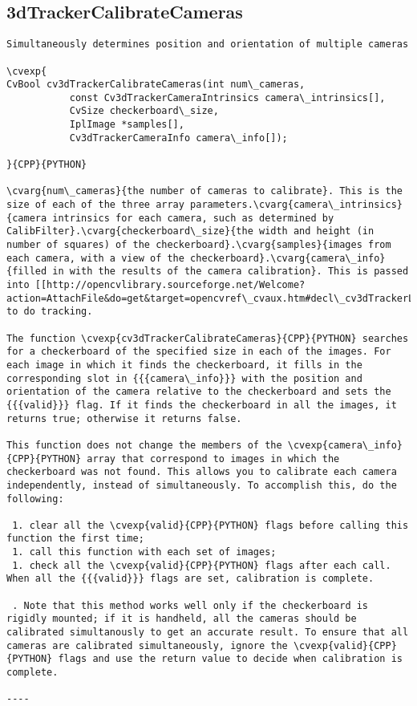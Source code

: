 \subsection{3dTrackerCalibrateCameras}
\begin{verbatim}
Simultaneously determines position and orientation of multiple cameras

\cvexp{
CvBool cv3dTrackerCalibrateCameras(int num\_cameras,
           const Cv3dTrackerCameraIntrinsics camera\_intrinsics[],
           CvSize checkerboard\_size,
           IplImage *samples[],
           Cv3dTrackerCameraInfo camera\_info[]);

}{CPP}{PYTHON}

\cvarg{num\_cameras}{the number of cameras to calibrate}. This is the size of each of the three array parameters.\cvarg{camera\_intrinsics}{camera intrinsics for each camera, such as determined by CalibFilter}.\cvarg{checkerboard\_size}{the width and height (in number of squares) of the checkerboard}.\cvarg{samples}{images from each camera, with a view of the checkerboard}.\cvarg{camera\_info}{filled in with the results of the camera calibration}. This is passed into [[http://opencvlibrary.sourceforge.net/Welcome?action=AttachFile&do=get&target=opencvref\_cvaux.htm#decl\_cv3dTrackerLocateObjects|3dTrackerLocateObjects]] to do tracking.

The function \cvexp{cv3dTrackerCalibrateCameras}{CPP}{PYTHON} searches for a checkerboard of the specified size in each of the images. For each image in which it finds the checkerboard, it fills in the corresponding slot in {{{camera\_info}}} with the position and orientation of the camera relative to the checkerboard and sets the {{{valid}}} flag. If it finds the checkerboard in all the images, it returns true; otherwise it returns false.

This function does not change the members of the \cvexp{camera\_info}{CPP}{PYTHON} array that correspond to images in which the checkerboard was not found. This allows you to calibrate each camera independently, instead of simultaneously. To accomplish this, do the following:

 1. clear all the \cvexp{valid}{CPP}{PYTHON} flags before calling this function the first time;
 1. call this function with each set of images;
 1. check all the \cvexp{valid}{CPP}{PYTHON} flags after each call. When all the {{{valid}}} flags are set, calibration is complete.

 . Note that this method works well only if the checkerboard is rigidly mounted; if it is handheld, all the cameras should be calibrated simultanously to get an accurate result. To ensure that all cameras are calibrated simultaneously, ignore the \cvexp{valid}{CPP}{PYTHON} flags and use the return value to decide when calibration is complete.

----
\end{verbatim}
